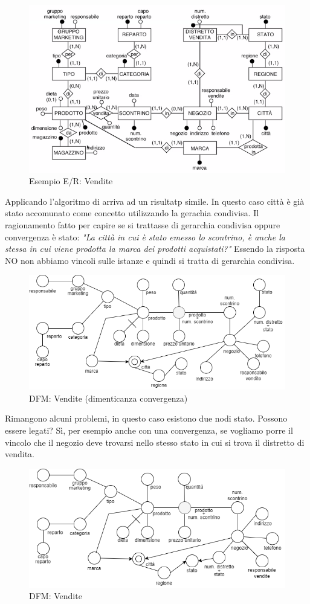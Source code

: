 \begin{figure}[H]
	\begin{center}
		\includegraphics[width=0.8\linewidth]{img/vendite.png}
		\caption{Esempio E/R: Vendite}
	\end{center}
\end{figure}
\noindent Applicando l'algoritmo di arriva ad un risultatp simile. In questo caso città è già stato accomunato come concetto utilizzando la gerachia condivisa. Il ragionamento fatto per capire se si trattasse di gerarchia condivisa oppure convergenza è stato:
\textit{"La città in cui è stato emesso lo scontrino, è anche la stessa in cui viene prodotta la marca dei prodotti acquistati?"}
Essendo la risposta NO non abbiamo vincoli sulle istanze e quindi si tratta di gerarchia condivisa.
\begin{figure}[H]
	\begin{center}
		\includegraphics[width=0.8\linewidth]{img/bi-example.drawio.png}
		\caption{DFM: Vendite (dimenticanza convergenza)}
	\end{center}
\end{figure}
\noindent Rimangono alcuni problemi, in questo caso esistono due nodi stato. Possono essere legati? Sì, per esempio anche con una convergenza, se vogliamo porre il vincolo che il negozio deve trovarsi nello stesso stato in cui si trova il distretto di vendita.
\begin{figure}[H]
	\begin{center}
		\includegraphics[width=0.8\linewidth]{img/bi-example.drawioconv.png}
		\caption{DFM: Vendite}
	\end{center}
\end{figure}
